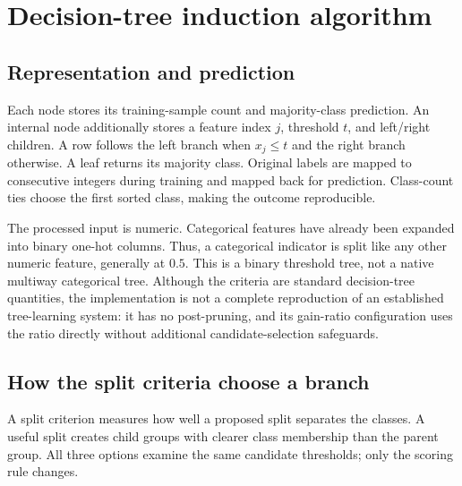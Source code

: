 \documentclass[11pt,letterpaper]{article}
\begin{document}
\section{Decision-tree induction algorithm}
\subsection{Representation and prediction}
Each node stores its training-sample count and majority-class prediction.
An internal node additionally stores a feature index $j$, threshold $t$, and
left/right children. A row follows the left branch when $x_j\leq t$ and the
right branch otherwise. A leaf returns its majority class. Original labels are
mapped to consecutive integers during training and mapped back for prediction.
Class-count ties choose the first sorted class, making the outcome reproducible.

The processed input is numeric. Categorical features have already been expanded
into binary one-hot columns. Thus, a categorical indicator is split like any
other numeric feature, generally at $0.5$. This is a binary threshold tree,
not a native multiway categorical tree. Although the criteria are standard
decision-tree quantities, the implementation is not a complete
reproduction of an established tree-learning system: it has no post-pruning,
and its gain-ratio configuration uses the ratio directly without additional
candidate-selection safeguards.

\subsection{How the split criteria choose a branch}
A split criterion measures how well a proposed split separates the classes.
A useful split creates child groups with clearer class membership than the
parent group. All three options examine the same candidate thresholds; only
the scoring rule changes.
\end{document}
